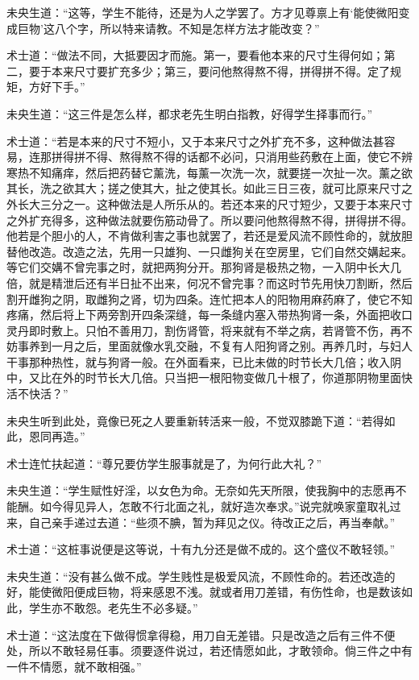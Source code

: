 \documentclass[a4paper,12pt,UTF8,twoside]{ctexbook}
\begin{document}
未央生道：“这等，学生不能待，还是为人之学罢了。方才见尊禀上有‘能使微阳变成巨物’这八个字，所以特来请教。不知是怎样方法才能改变？”

术士道：“做法不同，大抵要因才而施。第一，要看他本来的尺寸生得何如；第二，要于本来尺寸要扩充多少；第三，要问他熬得熬不得，拼得拼不得。定了规矩，方好下手。”

未央生道：“这三件是怎么样，都求老先生明白指教，好得学生择事而行。”

术士道：“若是本来的尺寸不短小，又于本来尺寸之外扩充不多，这种做法甚容易，连那拼得拼不得、熬得熬不得的话都不必问，只消用些药敷在上面，使它不辨寒热不知痛痒，然后把药替它薰洗，每薰一次洗一次，就要搓一次扯一次。薰之欲其长，洗之欲其大；搓之使其大，扯之使其长。如此三日三夜，就可比原来尺寸之外长大三分之一。这种做法是人所乐从的。若还本来的尺寸短少，又要于本来尺寸之外扩充得多，这种做法就要伤筋动骨了。所以要问他熬得熬不得，拼得拼不得。他若是个胆小的人，不肯做利害之事也就罢了，若还是爱风流不顾性命的，就放胆替他改造。改造之法，先用一只雄狗、一只雌狗关在空房里，它们自然交媾起来。等它们交媾不曾完事之时，就把两狗分开。那狗肾是极热之物，一入阴中长大几倍，就是精泄后还有半日扯不出来，何况不曾完事？而这时节先用快刀割断，然后割开雌狗之阴，取雌狗之肾，切为四条。连忙把本人的阳物用麻药麻了，使它不知疼痛，然后将上下两旁割开四条深缝，每一条缝内塞入带热狗肾一条，外面把收口灵丹即时敷上。只怕不善用刀，割伤肾管，将来就有不举之病，若肾管不伤，再不妨事养到一月之后，里面就像水乳交融，不复有人阳狗肾之别。再养几时，与妇人干事那种热性，就与狗肾一般。在外面看来，已比未做的时节长大几倍；收入阴中，又比在外的时节长大几倍。只当把一根阳物变做几十根了，你道那阴物里面快活不快活？”

未央生听到此处，竟像已死之人要重新转活来一般，不觉双膝跪下道：“若得如此，恩同再造。”

术士连忙扶起道：“尊兄要仿学生服事就是了，为何行此大礼？”

未央生道：“学生赋性好淫，以女色为命。无奈如先天所限，使我胸中的志愿再不能酬。如今得见异人，怎敢不行北面之礼，就好造次奉求。”说完就唤家童取礼过来，自己亲手递过去道：“些须不腆，暂为拜见之仪。待改正之后，再当奉献。”

术士道：“这桩事说便是这等说，十有九分还是做不成的。这个盛仪不敢轻领。”

未央生道：“没有甚么做不成。学生贱性是极爱风流，不顾性命的。若还改造的好，能使微阳便成巨物，将来感恩不浅。就或者用刀差错，有伤性命，也是数该如此，学生亦不敢怨。老先生不必多疑。”

术士道：“这法度在下做得惯拿得稳，用刀自无差错。只是改造之后有三件不便处，所以不敢轻易任事。须要逐件说过，若还情愿如此，才敢领命。倘三件之中有一件不情愿，就不敢相强。”
\end{document}
